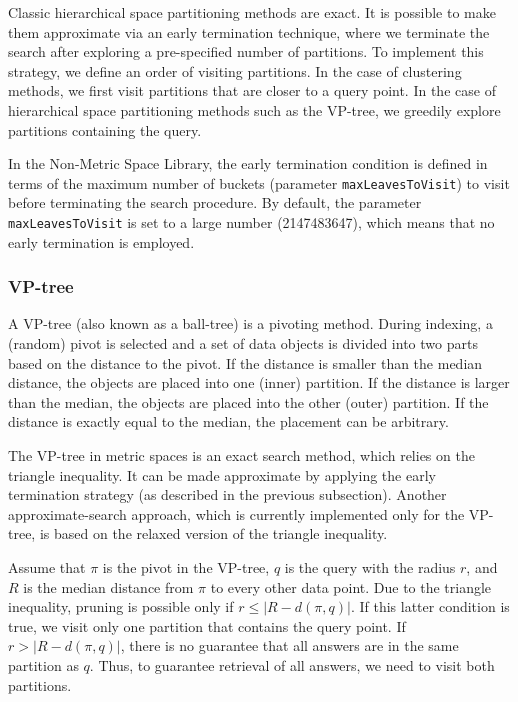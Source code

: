 \documentclass[runningheads,a4paper]{llncs}
\newcommand{\nonmetrlib}{Non-Metric Space Library}
\newcommand{\ttt}[1]{\texttt{#1}}
\begin{document}
{Classic hierarchical space partitioning methods are exact. 
It is possible to make them approximate via an early termination technique,
where we terminate the search after exploring a pre-specified number of partitions.
To implement this strategy, we define an order of visiting partitions.
In the case of clustering methods, we first visit partitions that are closer to a query point.
In the case of hierarchical space partitioning methods such as the VP-tree,
we greedily explore partitions containing the query.

In the \nonmetrlib, the early termination condition is defined in terms of 
the maximum number of buckets (parameter \ttt{maxLeavesToVisit})
to visit before terminating the search procedure.
By default, the parameter \ttt{maxLeavesToVisit} is set to a large number (2147483647), 
which means that no early termination is employed.

\subsubsection{VP-tree}\label{SectionVPtree}
A VP-tree \cite{Uhlmann:1991,Yianilos:1993} (also known as a ball-tree)
is a pivoting method.
During indexing, a (random) pivot is selected and a set of data objects is divided into
two parts based on the distance to the pivot.
If the distance is smaller than the median distance, the objects are placed into
one (inner) partition. If the distance is larger than the median,
the objects are placed into the other (outer) partition.
If the distance is exactly equal to the median, the placement can be arbitrary.

The VP-tree in metric spaces is an exact search method, which relies on the triangle inequality.
It can be made approximate by applying the early termination strategy (as described 
in the previous subsection).
Another approximate-search approach, 
which is currently implemented only for the VP-tree, 
is based on the relaxed version of the triangle inequality.

Assume that $\pi$ is the pivot in the VP-tree, $q$ is the query with the radius $r$, 
and $R$ is the median distance from $\pi$ to every other data point.
Due to the triangle inequality, pruning is possible only if $r \le |R - d(\pi, q)|$. 
If this latter condition is true, 
we visit only one partition that contains the query point.
If $r > |R - d(\pi, q)|$, there is no guarantee that all answers
are in the same partition as $q$. Thus, to guarantee retrieval of all answers,
we need to visit both partitions.

}
\end{document}
